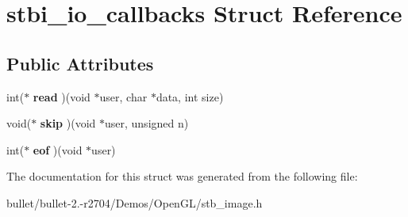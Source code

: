 \hypertarget{structstbi__io__callbacks}{\section{stbi\+\_\+io\+\_\+callbacks Struct Reference}
\label{structstbi__io__callbacks}
}
\subsection*{Public Attributes}
\begin{DoxyCompactItemize}
\item 
\hypertarget{structstbi__io__callbacks_a73818f0a4f467e5abfefb1d635f62d82}{int($\ast$ {\bfseries read} )(void $\ast$user, char $\ast$data, int size)}\label{structstbi__io__callbacks_a73818f0a4f467e5abfefb1d635f62d82}

\item 
\hypertarget{structstbi__io__callbacks_a796a5f4fe9ce2723398f011de4535ba4}{void($\ast$ {\bfseries skip} )(void $\ast$user, unsigned n)}\label{structstbi__io__callbacks_a796a5f4fe9ce2723398f011de4535ba4}

\item 
\hypertarget{structstbi__io__callbacks_a2c4f3c3b7c75a2e74a35caf74fb8d177}{int($\ast$ {\bfseries eof} )(void $\ast$user)}\label{structstbi__io__callbacks_a2c4f3c3b7c75a2e74a35caf74fb8d177}

\end{DoxyCompactItemize}


The documentation for this struct was generated from the following file\+:\begin{DoxyCompactItemize}
\item 
bullet/bullet-\/2.-\/r2704/\+Demos/\+Open\+G\+L/stb\+\_\+image.\+h\end{DoxyCompactItemize}
